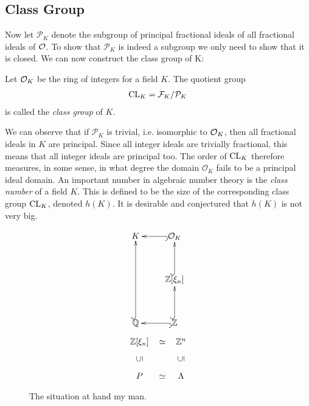 \subsection{Class Group}
    Now let \(\mathcal{P}_K\) denote the subgroup of principal fractional ideals of all fractional ideals of \(\mathcal{O}\). To show that \(\mathcal{P}_K\) is indeed a subgroup we only need to show that it is closed. We can now construct the class group of K:
    
    \begin{definition}
    Let \(\mathcal{O}_K\) be the ring of integers for a field \(K\). The quotient group
    \begin{align*}
        \text{CL} _K = \mathcal{F}_K/\mathcal{P}_K
    \end{align*}
    is called the \emph{class group} of \(K\). 
    \end{definition}
    We can observe that if \(\mathcal{P} _K\) is trivial, i.e. isomorphic to \(\mathcal{O}_K\), then all fractional ideals in \(K\) are principal. Since all integer ideals are trivially fractional, this means that all integer ideals are principal too. The order of \(\text{CL} _K\) therefore measures, in some sense, in what degree the domain \(\mathcal{O}_K\) fails to be a principal ideal domain. An important number in algebraic number theory is the \emph{class number} of a field \(K\). This is defined to be the size of the corresponding class group \(\text{CL} _K\), denoted \(h(K)\). It is desirable and conjectured that \(h(K)\) is not very big.
    \begin{figure}
    \[\xymatrixrowsep{3pc}
    \xymatrix{
    K & \OO_K\ar@{^{(}->}[l]\\
     & \mathbb{Z}[\xi_n] \ar@{^{(}->}[u] \\
    \mathbb{Q}\ar@{^{(}->}[uu] & \mathbb{Z} \ar@{^{(}->}[l]\ar@{^{(}->}[u]}
    \]
    \[
    \xymatrixrowsep{0.5pc}
    \xymatrixcolsep{0.5pc}
    \xymatrix{
    \mathbb{Z}[\xi_n] & \simeq &  \mathbb{Z}^n \\
    \rotatebox{90}{\(\subseteq\)} & & \rotatebox{90}{\(\subseteq\)} \\
    P & \simeq & \Lambda}
    \]
    \caption{The situation at hand my man.}
    \end{figure}

